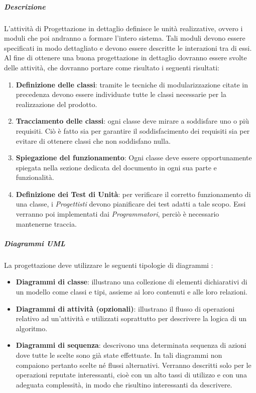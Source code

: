 \subparagraph{Descrizione}
L'attività di Progettazione in dettaglio definisce le unità realizzative, ovvero i moduli che poi andranno a formare l'intero sistema. Tali moduli devono essere specificati in modo dettagliato e devono essere descritte le interazioni tra di essi.
Al fine di ottenere una buona progettazione in dettaglio dovranno essere svolte delle attività, che dovranno portare come risultato i seguenti risultati:

\begin{enumerate}
\item \textbf{Definizione delle classi}: tramite le tecniche di modularizzazione citate in precedenza devono essere individuate tutte le classi necessarie per la realizzazione del prodotto.
\item \textbf{Tracciamento delle classi}: ogni classe deve mirare a soddisfare uno o più requisiti. Ciò è fatto sia per garantire il soddisfacimento dei requisiti sia per evitare di ottenere classi che non soddisfano nulla.
\item \textbf{Spiegazione del funzionamento}: Ogni classe deve essere opportunamente spiegata nella sezione dedicata del documento \DDP{} in ogni sua parte e funzionalità.
\item \textbf{Definizione dei Test di Unità}: per verificare il corretto funzionamento di una classe, i \textit{Progettisti} devono pianificare dei test adatti a tale scopo. Essi verranno poi implementati dai \textit{Programmatori}, perciò è necessario mantenerne traccia.
\end{enumerate}

\subparagraph{Diagrammi UML}
La progettazione deve utilizzare le seguenti tipologie di diagrammi :
\begin{itemize}
\item
\textbf{Diagrammi di classe}: illustrano una collezione di elementi dichiarativi di un modello come classi e tipi, assieme ai loro contenuti e alle loro relazioni.
\item
\textbf{Diagrammi di attività (opzionali)}: illustrano il flusso di operazioni relativo ad un'attività e utilizzati soprattutto per descrivere la logica di un algoritmo.
\item
\textbf{Diagrammi di sequenza}: descrivono una determinata sequenza di azioni dove tutte le scelte sono già state effettuate. In tali diagrammi non compaiono pertanto scelte né flussi alternativi. Verranno descritti solo per le operazioni reputate interessanti, cioè con un alto tassi di utilizzo e con una adeguata complessità, in modo che risultino interessanti da descrivere.
\end{itemize}

